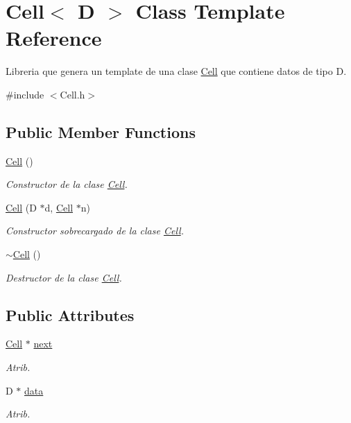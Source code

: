 \hypertarget{class_cell}{\section{Cell$<$ D $>$ Class Template Reference}
\label{class_cell}
}


Libreria que genera un template de una clase \hyperlink{class_cell}{Cell} que contiene datos de tipo D.  




{\ttfamily \#include $<$Cell.\+h$>$}

\subsection*{Public Member Functions}
\begin{DoxyCompactItemize}
\item 
\hyperlink{class_cell_a742a2adf7fa420fa9cbe386a87b5c79b}{Cell} ()
\begin{DoxyCompactList}\small\item\em Constructor de la clase \hyperlink{class_cell}{Cell}. \end{DoxyCompactList}\item 
\hyperlink{class_cell_addb102d2635522a2858eef6687407bcb}{Cell} (D $\ast$d, \hyperlink{class_cell}{Cell} $\ast$n)
\begin{DoxyCompactList}\small\item\em Constructor sobrecargado de la clase \hyperlink{class_cell}{Cell}. \end{DoxyCompactList}\item 
\hyperlink{class_cell_a545129618ba41b218c6be7293975efda}{$\sim$\+Cell} ()
\begin{DoxyCompactList}\small\item\em Destructor de la clase \hyperlink{class_cell}{Cell}. \end{DoxyCompactList}\end{DoxyCompactItemize}
\subsection*{Public Attributes}
\begin{DoxyCompactItemize}
\item 
\hyperlink{class_cell}{Cell} $\ast$ \hyperlink{class_cell_a7e0e6c090f8aca70862c2dbc3257e3b9}{next}
\begin{DoxyCompactList}\small\item\em Atrib. \end{DoxyCompactList}\item 
D $\ast$ \hyperlink{class_cell_ab8cc4d3059ef84a652eabc05b6c28f49}{data}
\begin{DoxyCompactList}\small\item\em Atrib. \end{DoxyCompactList}\end{DoxyCompactItemize}


